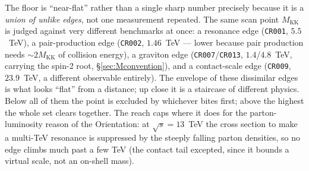 \documentclass[11pt]{article}
\newcommand{\MKK}{M_{\mathrm{KK}}}
\newcommand{\code}[1]{\texttt{#1}}
\theoremstyle{definition}
\begin{document}
The floor is ``near-flat'' rather than a single sharp number precisely because it
is a \emph{union of unlike edges}, not one measurement repeated. The same scan
point $\MKK$ is judged against very different benchmarks at once: a resonance
edge (\code{CR001}, $5.5$~TeV), a pair-production edge (\code{CR002}, $1.46$~TeV
--- lower because pair production needs $\sim 2\MKK$ of collision energy), a
graviton edge (\code{CR007}/\code{CR013}, $1.4$/$4.8$~TeV, carrying the spin-2
root, \S\ref{sec:Mconvention}), and a contact-scale edge (\code{CR009},
$23.9$~TeV, a different observable entirely). The envelope of these dissimilar
edges is what looks ``flat'' from a distance; up close it is a staircase of
different physics. Below all of them the point is excluded by whichever bites
first; above the highest the whole set clears together. The reach caps where it
does for the parton-luminosity reason of the Orientation: at $\sqrt s = 13$~TeV
the cross section to make a multi-TeV resonance is suppressed by the steeply
falling parton densities, so no edge climbs much past a few TeV (the contact tail
excepted, since it bounds a virtual scale, not an on-shell mass).
\end{document}
